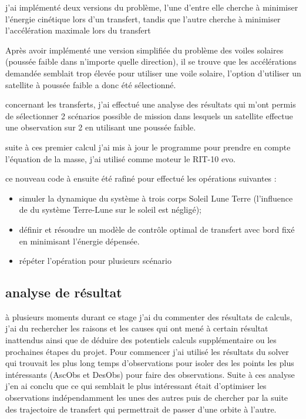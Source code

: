 \documentclass[12pt]{article} %
\begin{document}
		j'ai implémenté deux versions du problème, l'une d'entre elle cherche à minimiser l'énergie cinétique lors d'un transfert, tandis que l'autre cherche à minimiser l'accélération maximale lors du transfert
		
		Après avoir implémenté une version simplifiée du problème des voiles solaires (poussée faible dans n'importe quelle direction), il se trouve que les accélérations demandée semblait trop élevée pour utiliser une voile solaire, l'option d'utiliser un satellite à poussée faible a donc été sélectionné.
		
		concernant les transferts, j'ai effectué une analyse des résultats qui m'ont permis de sélectionner 2 scénarios possible de mission dans lesquels un satellite effectue une observation sur 2 en utilisant une poussée faible.
		
		suite à ces premier calcul j'ai mis à jour le programme pour prendre en compte l'équation de la masse, j'ai utilisé comme moteur le RIT-10 evo.
		
		ce nouveau code à ensuite été rafiné pour effectué les opérations suivantes : 
		
		\begin{itemize}
			\item simuler la dynamique du système à trois corps Soleil Lune Terre (l'influence de du système Terre-Lune sur le soleil est négligé);
			\item définir et résoudre un modèle de contrôle optimal de transfert avec bord fixé en minimisant l'énergie dépensée.
			\item répéter l'opération pour plusieurs scénario 
		\end{itemize}
		
		\subsection{analyse de résultat}
		
		à plusieurs moments durant ce stage j'ai du commenter des résultats de calculs, j'ai du rechercher les raisons et les causes qui ont mené à certain résultat inattendus ainsi que de déduire des potentiels calculs supplémentaire ou les prochaines étapes du projet. Pour commencer j'ai utilisé les résultats du solver qui trouvait les plus long temps d'observations pour isoler des les points les plus intéressants  (\gls{AscObs} et \gls{DesObs}) pour faire des observations. Suite à ces analyse j'en ai conclu que ce qui semblait le plus intéressant était d'optimiser les observations indépendamment les unes des autres puis de chercher par la suite des trajectoire de transfert qui permettrait de passer d'une orbite à l'autre.
		
\end{document}
